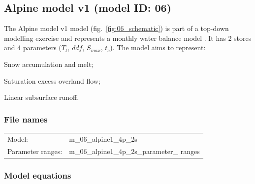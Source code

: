 \subsection{Alpine model v1 (model ID: 06)}
The Alpine model v1 model (fig.~\ref{fig:06_schematic}) is part of a top-down modelling exercise and represents a monthly water balance model \citep{Eder2003}. 
It has 2 stores and 4 parameters ($T_t$, $ddf$, $S_{max}$, $t_c$). 
The model aims to represent:

\begin{itemizecompact}
\item Snow accumulation and melt;
\item Saturation excess overland flow;
\item Linear subsurface runoff.
\end{itemizecompact}

\subsubsection{File names}
\begin{tabular}{@{}ll}
Model: &m\_06\_alpine1\_4p\_2s \\
Parameter ranges: &m\_06\_alpine1\_4p\_2s\_parameter\_ ranges \\
\end{tabular}

\subsubsection{Model equations}

